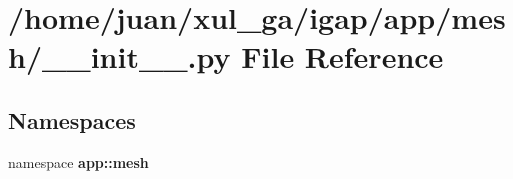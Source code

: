 \section{/home/juan/xul\_\-ga/igap/app/mesh/\_\-\_\-init\_\-\_\-.py File Reference}
\label{app_2mesh_2____init_____8py}
\subsection*{Namespaces}
\begin{CompactItemize}
\item 
namespace {\bf app::mesh}
\end{CompactItemize}
